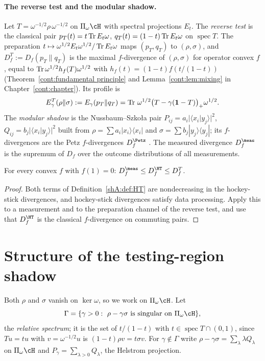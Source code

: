 \paragraph{The reverse test and the modular shadow.} Let $T=\omega^{-1/2}\rho\,\omega^{-1/2}$ on $\Pi_\omega\cH$ with spectral projections $E_t$. The \emph{reverse test} is the classical pair $p_T(t)=t\operatorname{Tr} E_t\omega$, $q_T(t)=(1-t)\operatorname{Tr} E_t\omega$ on $\operatorname{spec}T$. The preparation $t\mapsto\omega^{1/2}E_t\omega^{1/2}/\operatorname{Tr} E_t\omega$ maps $(p_T,q_T)$ to $(\rho,\sigma)$, and $D^T_f:=D_f(p_T\|q_T)$ is the maximal $f$-divergence of $(\rho,\sigma)$ for operator convex $f$ \cite{Matsumoto2018newf}, equal to $\operatorname{Tr}\omega^{1/2}h_f(T)\omega^{1/2}$ with $h_f(t)=(1-t)f(t/(1-t))$ (Theorem~\ref{cont:fundamental principle} and Lemma~\ref{cont:lem:mixing} in Chapter~\ref{cont:chapter}). Its profile is
\[
E^T_\gamma(\rho\|\sigma):=E_\gamma(p_T\|q_T)=\operatorname{Tr}\,\omega^{1/2}\big(T-\gamma(\mathbf 1-T)\big)_+\omega^{1/2}.
\]
The \emph{modular shadow} is the Nussbaum--Szko{\l}a pair $P_{ij}=a_i|\langle x_i|y_j\rangle|^2$, $Q_{ij}=b_j|\langle x_i|y_j\rangle|^2$ built from $\rho=\sum a_i|x_i\rangle\langle x_i|$ and $\sigma=\sum b_j|y_j\rangle\langle y_j|$; its $f$-divergences are the Petz $f$-divergences $D^\Petz_f$ \cite{NussbaumSzkola2009,HiaiMosonyi2017}. The measured divergence $D^\meas_f$ is the supremum of $D_f$ over the outcome distributions of all measurements.

\begin{proposition}\label{shA:prop:chain}
For every convex $f$ with $f(1)=0$: $D^\meas_f\le D^\HT_f\le D^T_f$.
\end{proposition}

\begin{proof}
Both terms of Definition~\ref{shA:def:HT} are nondecreasing in the hockey-stick divergences, and hockey-stick divergences satisfy data processing. Apply this to a measurement and to the preparation channel of the reverse test, and use that $D^\HT_f$ is the classical $f$-divergence on commuting pairs.
\end{proof}

\section{Structure of the testing-region shadow}\label{shA:sec:structure}

Both $\rho$ and $\sigma$ vanish on $\ker\omega$, so we work on $\Pi_\omega\cH$. Let
\[
\Gamma=\{\gamma>0:\ \rho-\gamma\sigma \text{ is singular on } \Pi_\omega\cH\},
\]
the \emph{relative spectrum}; it is the set of $t/(1-t)$ with $t\in\operatorname{spec}T\cap(0,1)$, since $Tu=tu$ with $v=\omega^{-1/2}u$ is $(1-t)\rho v=t\sigma v$. For $\gamma\notin\Gamma$ write $\rho-\gamma\sigma=\sum_\lambda\lambda Q_\lambda$ on $\Pi_\omega\cH$ and $P_\gamma=\sum_{\lambda>0}Q_\lambda$, the Helstrom projection.

